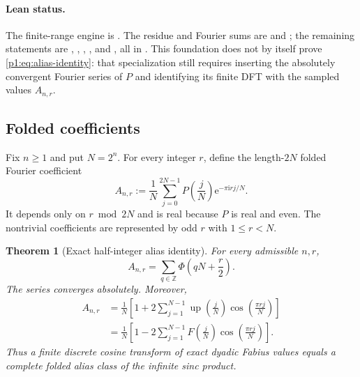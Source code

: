 \documentclass[11pt,oneside]{article}
\newtheorem{theorem}{Theorem}[section]
\theoremstyle{definition}
\theoremstyle{remark}
\newcommand{\Z}{\mathbb Z}
\newcommand{\Up}{\operatorname{up}}
\newcommand{\e}{\mathrm e}
\newcommand{\ii}{\mathrm i}
\newcommand{\PhiU}{\Phi}
\begin{document}
\paragraph{Lean status.}
The finite-range engine is
.  The residue and Fourier sums are
 and ; the remaining
statements are
,
,
,
, and
, all in
.  This foundation does not by itself prove
\eqref{p1:eq:alias-identity}: that specialization still requires inserting the
absolutely convergent Fourier series of \(P\) and identifying its finite DFT
with the sampled values \(A_{n,r}\).

\subsection{Folded coefficients}

Fix $n\ge1$ and put $N=2^n$.  For every integer $r$, define the
length-$2N$ folded Fourier coefficient
\begin{equation}\label{p1:eq:A-n-r-def}
 A_{n,r}:=\frac1N\sum_{j=0}^{2N-1}
 P\!\left(\frac jN\right)\e^{-\pi\ii rj/N}.
\end{equation}
It depends only on $r\bmod 2N$ and is real because $P$ is real and even.  The
nontrivial coefficients are represented by odd $r$ with $1\le r<N$.

\begin{theorem}[Exact half-integer alias identity]\label{p1:thm:alias-identity}
For every admissible $n,r$,
\begin{equation}\label{p1:eq:alias-identity}
 \boxed{
 A_{n,r}=\sum_{q\in\Z}\PhiU\!\left(qN+\frac r2\right).}
\end{equation}
The series converges absolutely.  Moreover,
\begin{align}
 A_{n,r}
 &=\frac1N\left[1+2\sum_{j=1}^{N-1}
 \Up\!\left(\frac jN\right)
 \cos\!\left(\frac{\pi rj}{N}\right)\right]
 \label{p1:eq:A-Up-DCT}\\
 &=\frac1N\left[1-2\sum_{j=1}^{N-1}
 F\!\left(\frac jN\right)
 \cos\!\left(\frac{\pi rj}{N}\right)\right].
 \label{p1:eq:A-F-DCT}
\end{align}
Thus a finite discrete cosine transform of exact dyadic Fabius values equals a
complete folded alias class of the infinite sinc product.
\end{theorem}
\end{document}
